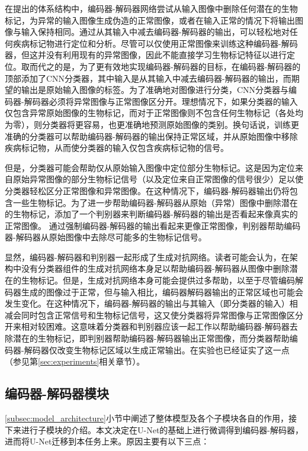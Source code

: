在提出的体系结构中，编码器-解码器网络尝试从输入图像中删除任何潜在的生物标记，为异常的输入图像生成伪造的正常图像，或者在输入正常的情况下将输出图像与输入保持相同。通过从其输入中减去编码器-解码器的输出，可以轻松地对任何疾病标记物进行定位和分析。尽管可以仅使用正常图像来训练这种编码器-解码器，但这并没有利用现有的异常图像，因此不能直接学习生物标记特征以进行定位。取而代之的是，为了更有效地实现编码器-解码器的目标，在编码器-解码器的顶部添加了CNN分类器，其中输入是从其输入中减去编码器-解码器的输出，而期望的输出是原始输入图像的标签。为了准确地对图像进行分类，CNN分类器与编码器-解码器必须将异常图像与正常图像区分开。理想情况下，如果分类器的输入仅包含异常原始图像的生物标记，而对于正常图像则不包含任何生物标记（各处均为零），则分类器将更容易，也更准确地预测原始图像的类别。换句话说，训练更准确的分类器可以帮助编码器-解码器的输出保持正常区域，并从原始图像中移除疾病标记物，从而使分类器的输入仅包含疾病标记物的信号。

但是，分类器可能会帮助仅从原始输入图像中定位部分生物标记。这是因为定位来自原始异常图像的部分生物标记信号（以及定位来自正常图像的信号很少）足以使分类器轻松区分正常图像和异常图像。在这种情况下，编码器-解码器输出仍将包含一些生物标记。为了进一步帮助编码器-解码器从原始（异常）图像中删除潜在的生物标记，添加了一个判别器来判断编码器-解码器的输出是否看起来像真实的正常图像。 通过强制编码器-解码器的输出看起来更像正常图像，判别器帮助编码器-解码器从原始图像中去除尽可能多的生物标记信号。

显然，编码器-解码器和判别器一起形成了生成对抗网络。读者可能会认为，在架构中没有分类器组件的生成对抗网络本身足以帮助编码器-解码器从图像中删除潜在的生物标记。但是，生成对抗网络本身可能会提供过多帮助，以至于尽管编码解码器生成的图像过于正常，但与输入相比，编码器解码器输出的正常区域也可能会发生变化。在这种情况下，编码器-解码器的输出与其输入（即分类器的输入）相减会同时包含正常信号和生物标记信号，这又使分类器将异常图像与正常图像区分开来相对较困难。这意味着分类器和判别器应该一起工作以帮助编码器-解码器去除潜在的生物标记，即判别器帮助编码器-解码器输出正常图像，而分类器帮助编码器-解码器仅改变生物标记区域以生成正常输出。在实验也已经证实了这一点（参见第\ref{sec:experiments}相关章节）。

\subsection{编码器-解码器模块}\label{subsec:encoder_decoder_model}
\ref{subsec:model_architecture}小节中阐述了整体模型及各个子模块各自的作用，接下来进行子模块的介绍。本文决定在U-Net的基础上进行微调得到编码器-解码器，进而将U-Net迁移到本任务上来。原因主要有以下三点：

